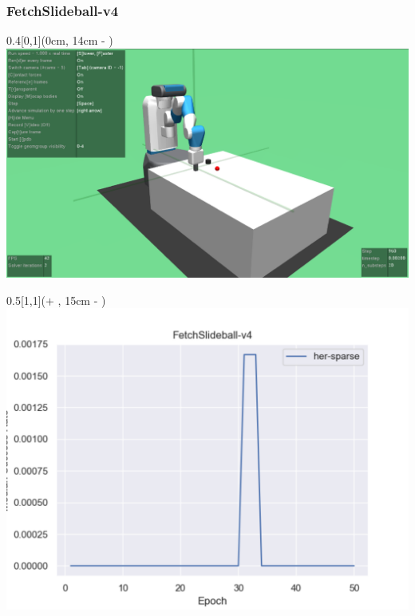 


\begin{frame}
	\frametitle{FetchSlideball-v4}	
	\vspace{1cm}
	
	\begin{textblock*}{0.4\paperwidth}[0,1](0cm, 14cm - \PraesentationSeitenrand)%
		\includegraphics[width=0.4\paperwidth]{./Ressourcen/Figures/FetchSlideball-v4.pdf}
	\end{textblock*}
	
	\begin{textblock*}{0.5\paperwidth}[1,1](\textwidth + \PraesentationSeitenrand, 15cm - \PraesentationSeitenrand)%
		\includegraphics[width=0.5\paperwidth]{./Ressourcen/Figures/fig_FetchSlideball-v4.pdf}
	\end{textblock*}
	
\end{frame}
\clearpage


